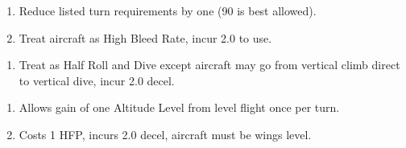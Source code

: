 \begin{table*}
\begin{multicols}{2}

\begin{enumerate}[nosep]
    \item Reduce listed turn requirements by one (90 is best allowed).
    \item Treat aircraft as High Bleed Rate, incur 2.0 to use.
\end{enumerate}


\begin{enumerate}[nosep]
    \item Treat as Half Roll and Dive except aircraft may go from vertical climb direct to vertical dive, incur 2.0 decel.
\end{enumerate}


\begin{enumerate}[nosep]
    \item Allows gain of one Altitude Level from level flight once per turn.
    \item Costs 1 HFP, incurs 2.0 decel, aircraft must be wings level.
\end{enumerate}

\end{multicols}

\end{table*}